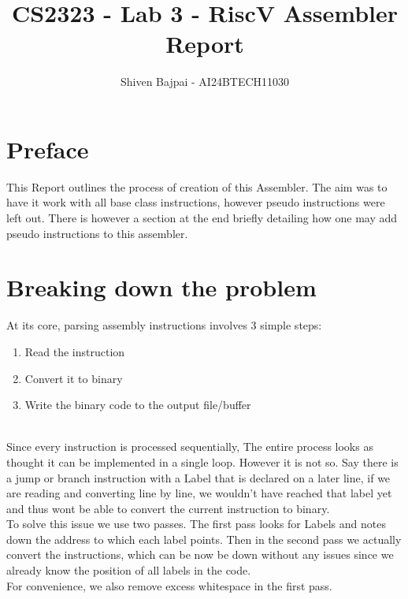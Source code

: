 \documentclass[journal,12pt,onecolumn]{IEEEtran}
\theoremstyle{remark}
\begin{document}
	
	\vspace{3cm}

	\title{CS2323 - Lab 3 - RiscV Assembler Report}
	\author{Shiven Bajpai - AI24BTECH11030}

	\maketitle
	\bigskip

	\renewcommand{\thefigure}{\theenumi}
	\renewcommand{\thetable}{\theenumi}

	\tableofcontents

	\newpage

	\section{Preface}
	This Report outlines the process of creation of this Assembler. The aim was to have it work with all base class instructions, however pseudo instructions were left out. There is however a section at the end briefly detailing how one may add pseudo instructions to this assembler.

	\section{Breaking down the problem}
	At its core, parsing assembly instructions involves 3 simple steps:\\

	\begin{enumerate}
		\item{Read the instruction}
		\item{Convert it to binary}
		\item{Write the binary code to the output file/buffer\\\\}
	\end{enumerate}

	Since every instruction is processed sequentially, The entire process looks as thought it can be implemented in a single loop. However it is not so. Say there is a jump or branch instruction with a Label that is declared on a later line, if we are reading and converting line by line, we wouldn't have reached that label yet and thus wont be able to convert the current instruction to binary.\\
	To solve this issue we use two passes. The first pass looks for Labels and notes down the address to which each label points. Then in the second pass we actually convert the instructions, which can be now be down without any issues since we already know the position of all labels in the code.\\
	For convenience, we also remove excess whitespace in the first pass.\\\\
\end{document}
